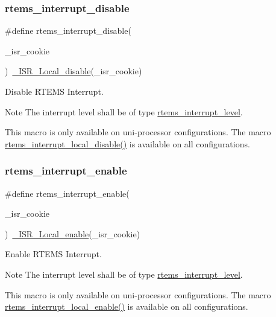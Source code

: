\subsubsection{\texorpdfstring{rtems\_interrupt\_disable}{rtems\_interrupt\_disable}}
{\footnotesize\ttfamily \#define rtems\+\_\+interrupt\+\_\+disable(\begin{DoxyParamCaption}\item[{}]{\+\_\+isr\+\_\+cookie }\end{DoxyParamCaption})~\mbox{\hyperlink{group__RTEMSScoreISR_ga2a829f51f98576aa596562985e1df2fc}{\+\_\+\+I\+S\+R\+\_\+\+Local\+\_\+disable}}(\+\_\+isr\+\_\+cookie)}



Disable R\+T\+E\+MS Interrupt. 

\begin{DoxyNote}{Note}
The interrupt level shall be of type \mbox{\hyperlink{group__ClassicINTR_ga9d815b0efd1f51936bb180683f26c436}{rtems\+\_\+interrupt\+\_\+level}}.
\end{DoxyNote}
This macro is only available on uni-\/processor configurations. The macro \mbox{\hyperlink{group__ClassicINTR_ga691a9f609c9d6bf071d0966b8b715fab}{rtems\+\_\+interrupt\+\_\+local\+\_\+disable()}} is available on all configurations. \mbox{\label{group__ClassicINTR_gae4fb58b530af7eaba10c45b015282090}} 
\subsubsection{\texorpdfstring{rtems\_interrupt\_enable}{rtems\_interrupt\_enable}}
{\footnotesize\ttfamily \#define rtems\+\_\+interrupt\+\_\+enable(\begin{DoxyParamCaption}\item[{}]{\+\_\+isr\+\_\+cookie }\end{DoxyParamCaption})~\mbox{\hyperlink{group__RTEMSScoreISR_ga508f5a32655cb590906a477b5a8174f1}{\+\_\+\+I\+S\+R\+\_\+\+Local\+\_\+enable}}(\+\_\+isr\+\_\+cookie)}



Enable R\+T\+E\+MS Interrupt. 

\begin{DoxyNote}{Note}
The interrupt level shall be of type \mbox{\hyperlink{group__ClassicINTR_ga9d815b0efd1f51936bb180683f26c436}{rtems\+\_\+interrupt\+\_\+level}}.
\end{DoxyNote}
This macro is only available on uni-\/processor configurations. The macro \mbox{\hyperlink{group__ClassicINTR_gabd2556ab8902ebb660b470e144bdc55a}{rtems\+\_\+interrupt\+\_\+local\+\_\+enable()}} is available on all configurations. \mbox{\label{group__ClassicINTR_ga994652cecbf5fc6e0bd8b9f5f2cb196d}} 
